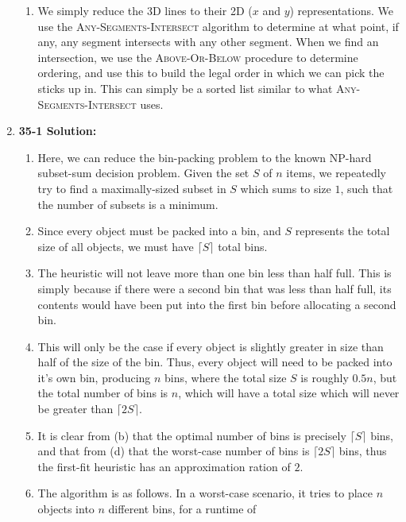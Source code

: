 \documentclass{article}
\begin{document}
\begin{enumerate}
\begin{enumerate}
        \item We simply reduce the 3D lines to their 2D ($x$ and $y$)
        representations. We use the \textsc{Any-Segments-Intersect} algorithm to
        determine at what point, if any, any segment intersects with any other
        segment. When we find an intersection, we use the
        \textsc{Above-Or-Below} procedure to determine ordering, and use this to
        build the legal order in which we can pick the sticks up in. This can
        simply be a sorted list similar to what \textsc{Any-Segments-Intersect}
        uses.
    \end{enumerate}
    \item \textbf{35-1 Solution:}
        \begin{enumerate}
            \item Here, we can reduce the bin-packing problem to the known
            NP-hard subset-sum decision problem. Given the set $S$ of $n$ items,
            we repeatedly try to find a maximally-sized subset in $S$ which sums
            to size $1$, such that the number of subsets is a minimum.
            \item Since every object must be packed into a bin, and $S$
            represents the total size of all objects, we must have $\lceil
            S\rceil$ total bins.
            \item The heuristic will not leave more than one bin less than half
            full. This is simply because if there were a second bin that was
            less than half full, its contents would have been put into the first
            bin before allocating a second bin.
            \item This will only be the case if every object is slightly greater
            in size than half of the size of the bin. Thus, every object will
            need to be packed into it's own bin, producing $n$ bins, where the
            total size $S$ is roughly $0.5n$, but the total number of bins is
            $n$, which will have a total size which will never be greater than
            $\lceil 2S\rceil$.
            \item It is clear from (b) that the optimal number of bins is
            precisely $\lceil S\rceil$ bins, and that from (d) that the
            worst-case number of bins is $\lceil 2S\rceil$ bins, thus the
            first-fit heuristic has an approximation ration of $2$.
            \item The algorithm is as follows. In a worst-case scenario, it
            tries to place $n$ objects into $n$ different bins, for a runtime of

\end{enumerate}
\end{enumerate}
\end{document}
